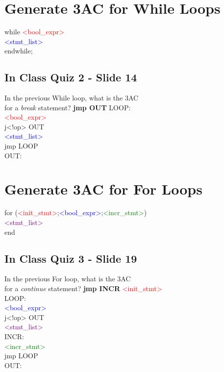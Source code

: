 \documentclass{report}
\newcommand{\textb}[1]{\textcolor{blue}{#1}}
\newcommand{\textg}[1]{\textcolor{green}{#1}}
\newcommand{\textp}[1]{\textcolor{purple}{#1}}
\newcommand{\textr}[1]{\textcolor{red}{#1}}
\newlength\tindent
\renewcommand{\indent}{\hspace*{\tindent}}
\begin{document}
\section{Generate 3AC for While Loops}
\vspace{-1em}
\begin{multicols}{2}
while \textr{<bool\_expr>} \\
\indent \textb{<stmt\_list>} \\
endwhile;


\subsection{In Class Quiz 2 - Slide 14}
\vspace{1em}
In the previous While loop, what is the 3AC \\ 
for a \textit{break} statement? \textbf{jmp OUT}
  \vfill\columnbreak
LOOP: \\
\indent \textr{<bool\_expr>} \\
\indent j<!op> OUT \\
\indent \textb{<stmt\_list>} \\
\indent jmp LOOP \\
OUT:
\end{multicols}

\section{Generate 3AC for For Loops}
\vspace{-1em}
\begin{multicols}{2}
for (\textr{<init\_stmt>};\textb{<bool\_expr>};\textg{<incr\_stmt>}) \\
\indent \textp{<stmt\_list>} \\
end


\subsection{In Class Quiz 3 - Slide 19}
In the previous For loop, what is the 3AC \\
for a \textit{continue} statement?
\textbf{jmp INCR}
  \vfill\columnbreak
\indent \textr{<init\_stmt>} \\
LOOP: \\
\indent \textb{<bool\_expr>} \\
\indent j<!op> OUT \\
\indent \textp{<stmt\_list>} \\
INCR: \\
\indent \textg{<incr\_stmt>} \\
\indent jmp LOOP \\
OUT:
\end{multicols}
\end{document}
